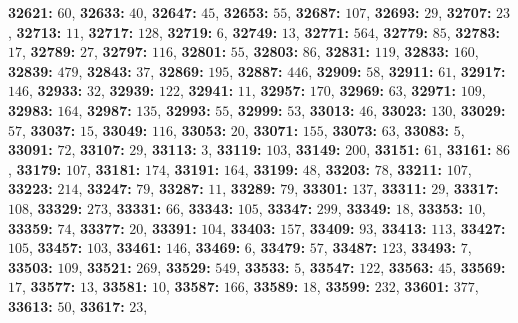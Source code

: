 \textsf{\bfseries 32621:} $60$, \textsf{\bfseries 32633:} $40$, \textsf{\bfseries 32647:} $45$, \textsf{\bfseries 32653:} $55$, \textsf{\bfseries 32687:} $107$, \textsf{\bfseries 32693:} $29$, \textsf{\bfseries 32707:} $23$, \textsf{\bfseries 32713:} $11$, \textsf{\bfseries 32717:} $128$, \textsf{\bfseries 32719:} $6$, \textsf{\bfseries 32749:} $13$, \textsf{\bfseries 32771:} $564$, \textsf{\bfseries 32779:} $85$, \textsf{\bfseries 32783:} $17$, \textsf{\bfseries 32789:} $27$, \textsf{\bfseries 32797:} $116$, \textsf{\bfseries 32801:} $55$, \textsf{\bfseries 32803:} $86$, \textsf{\bfseries 32831:} $119$, \textsf{\bfseries 32833:} $160$, \textsf{\bfseries 32839:} $479$, \textsf{\bfseries 32843:} $37$, \textsf{\bfseries 32869:} $195$, \textsf{\bfseries 32887:} $446$, \textsf{\bfseries 32909:} $58$, \textsf{\bfseries 32911:} $61$, \textsf{\bfseries 32917:} $146$, \textsf{\bfseries 32933:} $32$, \textsf{\bfseries 32939:} $122$, \textsf{\bfseries 32941:} $11$, \textsf{\bfseries 32957:} $170$, \textsf{\bfseries 32969:} $63$, \textsf{\bfseries 32971:} $109$, \textsf{\bfseries 32983:} $164$, \textsf{\bfseries 32987:} $135$, \textsf{\bfseries 32993:} $55$, \textsf{\bfseries 32999:} $53$, \textsf{\bfseries 33013:} $46$, \textsf{\bfseries 33023:} $130$, \textsf{\bfseries 33029:} $57$, \textsf{\bfseries 33037:} $15$, \textsf{\bfseries 33049:} $116$, \textsf{\bfseries 33053:} $20$, \textsf{\bfseries 33071:} $155$, \textsf{\bfseries 33073:} $63$, \textsf{\bfseries 33083:} $5$, \textsf{\bfseries 33091:} $72$, \textsf{\bfseries 33107:} $29$, \textsf{\bfseries 33113:} $3$, \textsf{\bfseries 33119:} $103$, \textsf{\bfseries 33149:} $200$, \textsf{\bfseries 33151:} $61$, \textsf{\bfseries 33161:} $86$, \textsf{\bfseries 33179:} $107$, \textsf{\bfseries 33181:} $174$, \textsf{\bfseries 33191:} $164$, \textsf{\bfseries 33199:} $48$, \textsf{\bfseries 33203:} $78$, \textsf{\bfseries 33211:} $107$, \textsf{\bfseries 33223:} $214$, \textsf{\bfseries 33247:} $79$, \textsf{\bfseries 33287:} $11$, \textsf{\bfseries 33289:} $79$, \textsf{\bfseries 33301:} $137$, \textsf{\bfseries 33311:} $29$, \textsf{\bfseries 33317:} $108$, \textsf{\bfseries 33329:} $273$, \textsf{\bfseries 33331:} $66$, \textsf{\bfseries 33343:} $105$, \textsf{\bfseries 33347:} $299$, \textsf{\bfseries 33349:} $18$, \textsf{\bfseries 33353:} $10$, \textsf{\bfseries 33359:} $74$, \textsf{\bfseries 33377:} $20$, \textsf{\bfseries 33391:} $104$, \textsf{\bfseries 33403:} $157$, \textsf{\bfseries 33409:} $93$, \textsf{\bfseries 33413:} $113$, \textsf{\bfseries 33427:} $105$, \textsf{\bfseries 33457:} $103$, \textsf{\bfseries 33461:} $146$, \textsf{\bfseries 33469:} $6$, \textsf{\bfseries 33479:} $57$, \textsf{\bfseries 33487:} $123$, \textsf{\bfseries 33493:} $7$, \textsf{\bfseries 33503:} $109$, \textsf{\bfseries 33521:} $269$, \textsf{\bfseries 33529:} $549$, \textsf{\bfseries 33533:} $5$, \textsf{\bfseries 33547:} $122$, \textsf{\bfseries 33563:} $45$, \textsf{\bfseries 33569:} $17$, \textsf{\bfseries 33577:} $13$, \textsf{\bfseries 33581:} $10$, \textsf{\bfseries 33587:} $166$, \textsf{\bfseries 33589:} $18$, \textsf{\bfseries 33599:} $232$, \textsf{\bfseries 33601:} $377$, \textsf{\bfseries 33613:} $50$, \textsf{\bfseries 33617:} $23$, 
